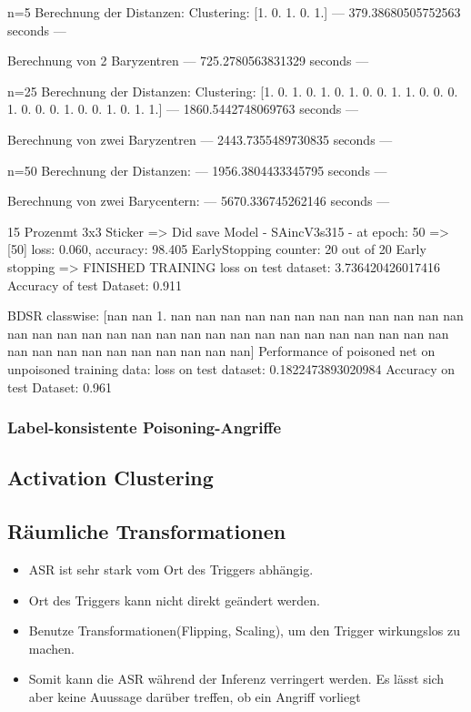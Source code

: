 \documentclass[twoside, 12pt,a4paper]{article}
\numberwithin{equation}{section}
\begin{document}
	
	n=5
	Berechnung der Distanzen:
	Clustering:  [1. 0. 1. 0. 1.]
	--- 379.38680505752563 seconds ---
	
	Berechnung von 2 Baryzentren
	--- 725.2780563831329 seconds ---
	
	n=25
	Berechnung der Distanzen:
	Clustering:  [1. 0. 1. 0. 1. 0. 1. 0. 0. 1. 1. 0. 0. 0. 1. 0. 0. 0. 1. 0. 0. 1. 0. 1.
	1.]
	--- 1860.5442748069763 seconds ---
	
	Berechnung von zwei Baryzentren
	--- 2443.7355489730835 seconds ---
	
	n=50
	Berechnung der Distanzen:
	--- 1956.3804433345795 seconds ---
	
	Berechnung von zwei Barycentern:
	--- 5670.336745262146 seconds ---
	
	15 Prozenmt 3x3 Sticker
	=> Did save Model - SAincV3s315 - at epoch: 50
	=>	[50] loss: 0.060, accuracy: 98.405%
	EarlyStopping counter: 20 out of 20
	Early stopping
	=>	FINISHED TRAINING
	loss on test dataset: 3.736420426017416
	Accuracy of test Dataset: 0.911 
	
	BDSR classwise:
	[nan nan  1. nan nan nan nan nan nan nan nan nan nan nan nan nan nan nan
	nan nan nan nan nan nan nan nan nan nan nan nan nan nan nan nan nan nan
	nan nan nan nan nan nan nan]
	Performance of poisoned net on unpoisoned training data:
	loss on test dataset: 0.1822473893020984
	Accuracy on test Dataset: 0.961 
	
	\begin{center}
		
	\end{center}
	
	
	\subsubsection{Label-konsistente Poisoning-Angriffe}
	\subsection{Activation Clustering}
	\subsection{Räumliche Transformationen}
	\begin{itemize}
		\item ASR ist sehr stark vom Ort des Triggers abhängig.
		\item Ort des Triggers kann nicht direkt geändert werden.
		\item Benutze Transformationen(Flipping, Scaling), um den Trigger wirkungslos zu machen.
		\item Somit kann die ASR während der Inferenz verringert werden. Es lässt sich aber keine Auussage darüber treffen, ob ein Angriff vorliegt
	\end{itemize}
	
\end{document}

